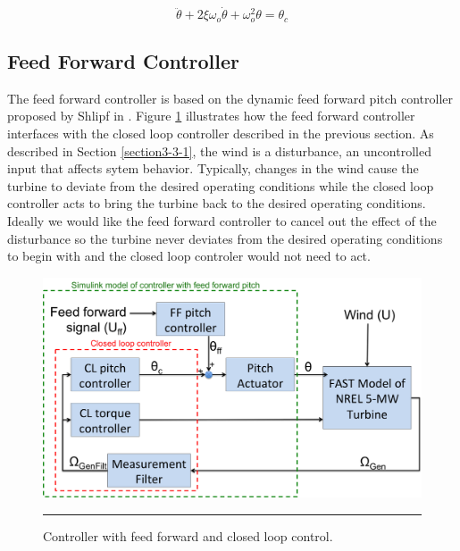 \begin{equation}
	\ddot{\theta } + 2\xi \omega_o \dot{\theta} + \omega_{o}^{2}\theta = \theta_c \label{eq3-1}
\end{equation}




\subsection{Feed Forward Controller} \label{section3-3-3}

The feed forward controller is based on the dynamic feed forward pitch controller proposed by Shlipf in \cite{schlipf2010}. Figure \ref{fig3-10} illustrates how the feed forward controller interfaces with the closed loop controller described in the previous section. As described in Section \ref{section3-3-1}, the wind is a disturbance, an uncontrolled input that affects sytem behavior. Typically, changes in the wind cause the turbine to deviate from the desired operating conditions while the closed loop controller acts to bring the turbine back to the desired operating conditions. Ideally we would like the feed forward controller to cancel out the effect of the disturbance so the turbine never deviates from the desired operating conditions to begin with and the closed loop controler would not need to act.

 \begin{figure}[htbp]
	\centering
		\includegraphics[width=\linewidth]{Figures/ch3Figures/fig3-10.png}
		\rule{35em}{0.5pt}
	\caption{Controller with feed forward and closed loop control.}
	\label{fig3-10}
\end{figure}

